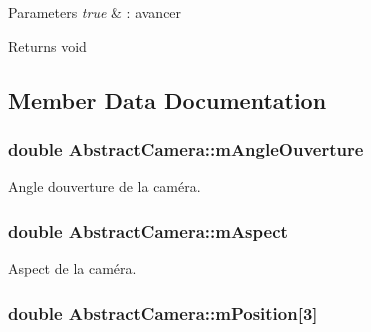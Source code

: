\begin{DoxyParams}{Parameters}
{\em true} & \+: avancer \\
\hline
\end{DoxyParams}
\begin{DoxyReturn}{Returns}
void 
\end{DoxyReturn}


\subsection{Member Data Documentation}
\subsubsection[{\texorpdfstring{m\+Angle\+Ouverture}{mAngleOuverture}}]{\setlength{\rightskip}{0pt plus 5cm}double Abstract\+Camera\+::m\+Angle\+Ouverture\hspace{0.3cm}{\ttfamily [protected]}}\hypertarget{class_abstract_camera_a5facdc9b6a67be951f8adea9d7ed8756}{}\label{class_abstract_camera_a5facdc9b6a67be951f8adea9d7ed8756}


Angle d\textquotesingle{}ouverture de la caméra. 

\subsubsection[{\texorpdfstring{m\+Aspect}{mAspect}}]{\setlength{\rightskip}{0pt plus 5cm}double Abstract\+Camera\+::m\+Aspect\hspace{0.3cm}{\ttfamily [protected]}}\hypertarget{class_abstract_camera_a84ea352c679449eeef49d92274bfc9e0}{}\label{class_abstract_camera_a84ea352c679449eeef49d92274bfc9e0}


Aspect de la caméra. 

\subsubsection[{\texorpdfstring{m\+Position}{mPosition}}]{\setlength{\rightskip}{0pt plus 5cm}double Abstract\+Camera\+::m\+Position\mbox{[}3\mbox{]}\hspace{0.3cm}{\ttfamily [protected]}}\hypertarget{class_abstract_camera_aacd5e7f2d881e719f254a1d6e2904b91}{}\label{class_abstract_camera_aacd5e7f2d881e719f254a1d6e2904b91}


